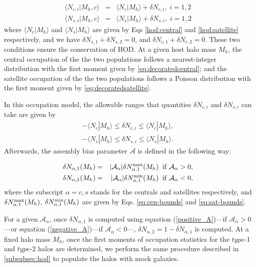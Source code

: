 \documentclass[12pt, preprint]{aastex}
\begin{document}
\begin{eqnarray}
\langle N_{c,i} | M_{h},c\rangle &=& \langle N_{c} | M_{h}\rangle + \delta N _{c,i}, \; i=1,2 \label{eq:decoratedcentral} \\
\langle N_{s,i} | M_{h},c\rangle &=& \langle N_{s} | M_{h}\rangle + \delta N _{s,i}, \; i=1,2 \label{eq:decoratedsatellite}
\end{eqnarray}
where $\langle N_{c} | M_{h}\rangle$ and $\langle N_{s} | M_{h}\rangle$ are given by Eqs \ref{hod:central} and \ref{hod:satellite} respectively, and we have $\delta N_{s,1} + \delta N_{s,2} = 0$, and $\delta N_{c,1} + \delta N_{c,2} = 0$. These two conditions ensure the conservation of HOD. At a given host halo mass $M_{h}$, the central occupation of the the two populations follows a nearest-integer distribution with the first moment given by \ref{eq:decoratedcentral}; and the satellite occupation of the the two populations follows a Poisson distribution with the first moment given by \ref{eq:decoratedsatellite}.

In this occupation model, the allowable ranges that quantities $\delta N_{c,i}$ and $\delta N_{s,i}$ can take are given by 
\begin{eqnarray}
-\langle N_{c} | M_{h}\rangle \leq \delta N_{c,i} \leq \langle N_{c} | M_{h}\rangle
 , \label{eq:cen-bounds} \\
-\langle N_{s} | M_{h}\rangle \leq \delta N_{s,i} \leq \langle N_{s} | M_{h}\rangle. \label{eq:sat-bounds}
\end{eqnarray}
Afterwards, the assembly bias parameter $\mathcal{A}$ is defined in the following way:

\begin{eqnarray}
\delta N_{\alpha , 1}(M_{h}) &=& |\mathcal{A_\alpha}| \delta N_{\alpha , 1}^{\rm max}(M_{h}) \; \; \rm{if} \; \mathcal{A_\alpha} > 0,  \label{positive_A} \\
\delta N_{\alpha , 1}(M_{h}) &=& |\mathcal{A_\alpha}| \delta N_{\alpha , 1}^{\rm min}(M_{h}) \; \; \rm{if} \; \mathcal{A_\alpha} < 0, \label{negative_A}
\end{eqnarray}
where the subscript $\alpha = c , s$ stands for the centrals and satellites respectively, and $\delta N_{\alpha , 1}^{\rm max}(M_{h})$, $\delta N_{\alpha , 1}^{\rm min}(M_{h})$ are given by Eqs. \ref{eq:cen-bounds} and \ref{eq:sat-bounds}. 

For a given $\mathcal{A}_{\alpha}$, once $\delta N_{\alpha,1}$ is computed using equation (\ref{positive_A})---if $\mathcal{A}_{\alpha}>0$---or equation (\ref{negative_A})---if $\mathcal{A}_{\alpha}<0$---, $\delta N_{\alpha,2} = 1 - \delta N_{\alpha,1}$ is computed. At a fixed halo mass $M_{h}$, once the first moments of occupation statistics for the $type$-1 and $type$-2 halos are determined, we perform the same procedure described in \ref{subsubsec:hod} to populate the halos with mock galaxies.
\end{document}
